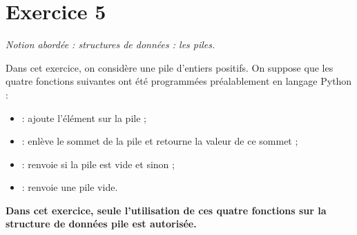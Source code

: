 \documentclass[11pt,a4paper,french,twoside]{PMCours}
\begin{document}
\newpage
\section*{Exercice 5}
\emph{Notion abordée : structures de données : les piles.}

\medskip
Dans cet exercice, on considère une pile d'entiers positifs. On suppose que les quatre
fonctions suivantes ont été programmées préalablement en langage Python :
\begin{itemize}
\item[]  : ajoute l'élément  sur la pile  ;
\item[]  : enlève le sommet de la pile  et retourne la valeur de ce sommet ;
\item[]  : renvoie  si la pile est vide et  sinon ;
\item[]  : renvoie une pile vide.
\end{itemize} 

\textbf{Dans cet exercice, seule l'utilisation de ces quatre fonctions sur la structure de
données pile est autorisée.}
\end{document}
